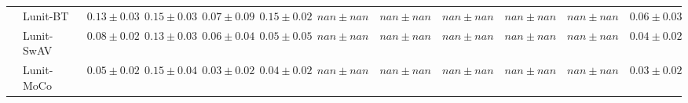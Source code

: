 \begin{tabular}{ll|cccc|c|cccc|c}
 & Lunit-BT~\cite{kang2023benchmarking} & $0.13 \pm 0.03$ & $0.15 \pm 0.03$ & $0.07 \pm 0.09$ & $0.15 \pm 0.02$ & $nan \pm nan$ & $nan \pm nan$ & $nan \pm nan$ & $nan \pm nan$ & $nan \pm nan$ & $0.06 \pm 0.03$ \\
 & Lunit-SwAV~\cite{kang2023benchmarking} & $0.08 \pm 0.02$ & $0.13 \pm 0.03$ & $0.06 \pm 0.04$ & $0.05 \pm 0.05$ & $nan \pm nan$ & $nan \pm nan$ & $nan \pm nan$ & $nan \pm nan$ & $nan \pm nan$ & $0.04 \pm 0.02$ \\
 & Lunit-MoCo~\cite{kang2023benchmarking} & $0.05 \pm 0.02$ & $0.15 \pm 0.04$ & $0.03 \pm 0.02$ & $0.04 \pm 0.02$ & $nan \pm nan$ & $nan \pm nan$ & $nan \pm nan$ & $nan \pm nan$ & $nan \pm nan$ & $0.03 \pm 0.02$ \\
\cline{1-12}
\bottomrule
\end{tabular}
